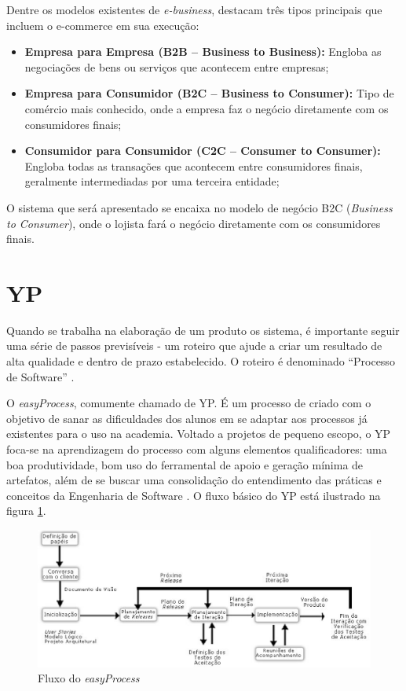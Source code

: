 \documentclass[a4paper,12pt]{monografia}
\begin{document}
Dentre os modelos existentes de \textit{e-business},  destacam três tipos principais que incluem o e-commerce em sua execução:

\begin{itemize}
\item \textbf{Empresa para Empresa (B2B – Business to Business):} Engloba as negociações de bens ou serviços que acontecem entre empresas;
\item \textbf{Empresa para Consumidor (B2C – Business to Consumer):} Tipo de comércio mais conhecido, onde a empresa faz o negócio diretamente com os consumidores finais;
\item \textbf{Consumidor para Consumidor (C2C – Consumer to Consumer):} Engloba todas as transações que acontecem entre consumidores finais, geralmente intermediadas por uma terceira entidade;
\end{itemize}

O sistema que será apresentado se encaixa no modelo de negócio B2C (\textit{Business to Consumer}), onde o lojista fará o negócio diretamente com os consumidores finais.

\section{YP} %
\label{sec:yp}

Quando se trabalha na elaboração de um produto os sistema, é importante seguir uma série de passos previsíveis - um roteiro que ajude a criar um resultado de alta qualidade e dentro de prazo estabelecido. O roteiro é denominado ``Processo de Software'' \cite{pressman}.

O \textit{easyProcess}, comumente chamado de YP. É um processo de  criado com o objetivo de sanar as dificuldades dos alunos em se adaptar aos processos já existentes para o uso na academia. Voltado a projetos de pequeno escopo, o YP foca-se na aprendizagem do processo com alguns elementos qualificadores: uma boa produtividade, bom uso do ferramental de apoio e geração mínima de artefatos, além de se buscar uma consolidação do entendimento das práticas e conceitos da Engenharia de Software \cite{easyprocess}. O fluxo básico do YP está ilustrado na figura \ref{figura:yp}.

\begin{figure}[H]	
\centering
\includegraphics[width=15cm]{img/yp.eps}
\caption{Fluxo do \textit{easyProcess}}
\label{figura:yp}
\end{figure}
\end{document}
